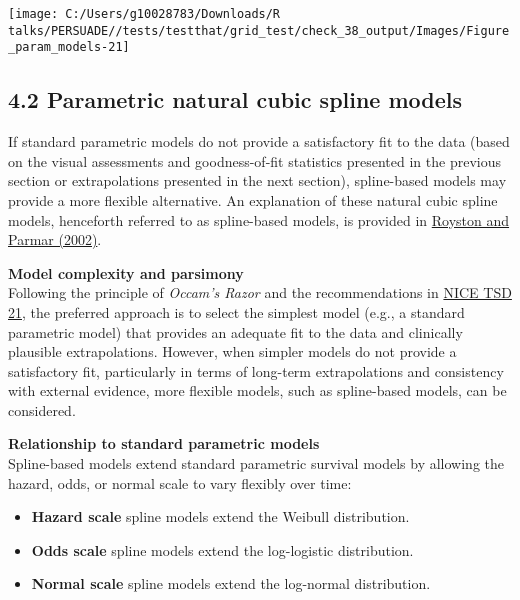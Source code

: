 \documentclass[
]{article}
\providecommand{\tightlist}{%
  \setlength{\itemsep}{0pt}\setlength{\parskip}{0pt}}
\begin{document}
\begin{flushleft}\texttt{[image: C:/Users/g10028783/Downloads/R talks/PERSUADE//tests/testthat/grid\_test/check\_38\_output/Images/Figure\_param\_models-21]} \end{flushleft}

\clearpage

\subsection{4.2 Parametric natural cubic spline
models}\label{parametric-natural-cubic-spline-models}

If standard parametric models do not provide a satisfactory fit to the
data (based on the visual assessments and goodness-of-fit statistics
presented in the previous section or extrapolations presented in the
next section), spline-based models may provide a more flexible
alternative. An explanation of these natural cubic spline models,
henceforth referred to as spline-based models, is provided in
\href{https://doi.org/10.1002/sim.1203}{Royston and Parmar (2002)}.

\textbf{Model complexity and parsimony}\\
Following the principle of \emph{Occam's Razor} and the recommendations
in
\href{https://www.sheffield.ac.uk/media/34188/download?attachment}{NICE
TSD 21}, the preferred approach is to select the simplest model (e.g., a
standard parametric model) that provides an adequate fit to the data and
clinically plausible extrapolations. However, when simpler models do not
provide a satisfactory fit, particularly in terms of long-term
extrapolations and consistency with external evidence, more flexible
models, such as spline-based models, can be considered.

\textbf{Relationship to standard parametric models}\\
Spline-based models extend standard parametric survival models by
allowing the hazard, odds, or normal scale to vary flexibly over time:

\begin{itemize}
\tightlist
\item
  \textbf{Hazard scale} spline models extend the Weibull distribution.\\
\item
  \textbf{Odds scale} spline models extend the log-logistic
  distribution.\\
\item
  \textbf{Normal scale} spline models extend the log-normal
  distribution.
\end{itemize}
\end{document}
